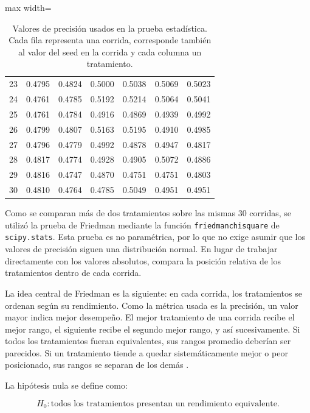 \documentclass[12pt]{article}
\begin{document}
\begin{table}[H]
\begin{adjustbox}{max width=\textwidth}
\begin{tabular}{ccccccc}
  23 & 0.4795 & 0.4824 & 0.5000 & 0.5038 & 0.5069 & 0.5023 \\
  24 & 0.4761 & 0.4785 & 0.5192 & 0.5214 & 0.5064 & 0.5041 \\
  25 & 0.4761 & 0.4784 & 0.4916 & 0.4869 & 0.4939 & 0.4992 \\
  26 & 0.4799 & 0.4807 & 0.5163 & 0.5195 & 0.4910 & 0.4985 \\
  27 & 0.4796 & 0.4779 & 0.4992 & 0.4878 & 0.4947 & 0.4817 \\
  28 & 0.4817 & 0.4774 & 0.4928 & 0.4905 & 0.5072 & 0.4886 \\
  29 & 0.4816 & 0.4747 & 0.4870 & 0.4751 & 0.4751 & 0.4803 \\
  30 & 0.4810 & 0.4764 & 0.4785 & 0.5049 & 0.4951 & 0.4951 \\
  \bottomrule
  \end{tabular}
  \end{adjustbox}
  \caption{Valores de precisión usados en la prueba estadística. Cada fila representa una corrida, corresponde también al valor del seed en la corrida y
  cada columna un tratamiento.}
  \label{tab:stat-all-runs}
  \end{table}

Como se comparan más de dos tratamientos sobre las mismas 30 corridas, se utilizó la prueba de
Friedman mediante la función \texttt{friedmanchisquare} de \texttt{scipy.stats}. Esta prueba es
no paramétrica, por lo que no exige asumir que los valores de precisión siguen una distribución
normal. En lugar de trabajar directamente con los valores absolutos, compara la posición relativa
de los tratamientos dentro de cada corrida.

La idea central de Friedman es la siguiente: en cada corrida, los tratamientos se ordenan según
su rendimiento. Como la métrica usada es la precisión, un valor mayor indica mejor desempeño. El
mejor tratamiento de una corrida recibe el mejor rango, el siguiente recibe el segundo mejor
rango, y así sucesivamente. Si todos los tratamientos fueran equivalentes, sus rangos promedio
deberían ser parecidos. Si un tratamiento tiende a quedar sistemáticamente mejor o peor
posicionado, sus rangos se separan de los demás \cite{richardson2018friedman}.

La hipótesis nula se define como:

\begin{equation}
H_0: \text{todos los tratamientos presentan un rendimiento equivalente.}
\end{equation}
\end{document}
